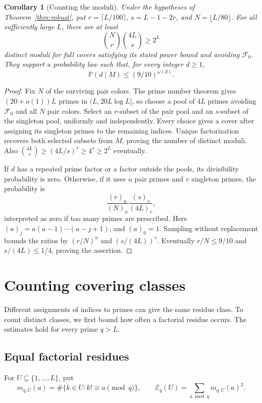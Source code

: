 \documentclass[11pt]{amsart}
\newtheorem{corollary}[theorem]{Corollary}
\theoremstyle{definition}
\theoremstyle{remark}
\begin{document}
\begin{corollary}[Counting the moduli]\label{cor:modulifamily}
Under the hypotheses of Theorem~\ref{thm:robust}, put
$r=\lceil L/100\rceil$, $s=L-1-2r$, and $N=\lfloor L/80\rfloor$.
For all sufficiently large $L$, there are at least
\[
\binom Nr\binom{4L}s\geq2^L
\]
distinct moduli for full covers satisfying its stated power bound and avoiding
$\mathcal F_0$. They support a probability law such that, for every
integer $d\geq1$,
\[
\mathbb P(d\mid M)\leq(9/10)^{\omega(d)}.
\]
\end{corollary}
\begin{proof}
Fix $N$ of the surviving pair colors. The prime number theorem gives
$(20+o(1))L$ primes in $(L,20L\log L]$, so choose a pool of $4L$ primes
avoiding $\mathcal F_0$ and all $N$ pair colors. Select an $r$-subset of
the pair pool and an $s$-subset of the singleton pool, uniformly and
independently. Every choice gives a cover after assigning its singleton
primes to the remaining indices. Unique factorization recovers both
selected subsets from $M$, proving the number of distinct moduli.
Also $\binom{4L}s\geq(4L/s)^s\geq4^s\geq2^L$ eventually.

If $d$ has a repeated prime factor or a factor outside the pools, its
divisibility probability is zero. Otherwise, if it uses $u$ pair primes
and $v$ singleton primes, the probability is
\[
\frac{(r)_u}{(N)_u}\frac{(s)_v}{(4L)_v},
\]
interpreted as zero if too many primes are prescribed.
Here $(a)_j=a(a-1)\cdots(a-j+1)$, and $(a)_0=1$.
Sampling without replacement bounds the ratios by $(r/N)^u$ and
$(s/(4L))^v$. Eventually $r/N\leq9/10$ and $s/(4L)\leq1/4$, proving
the assertion.
\end{proof}

\section{Counting covering classes}\label{sec:ensemble}

Different assignments of indices to primes can give the same residue
class. To count distinct classes, we first bound how often a factorial
residue occurs. The estimates hold for every prime $q>L$.

\subsection{Equal factorial residues}
For $U\subseteq\{1,\ldots,L\}$, put
\[
m_{q,U}(a)=\#\{k\in U:k!\equiv a\pmod q\},
\qquad
\mathcal E_q(U)=\sum_{a\bmod q}m_{q,U}(a)^2.
\]
\end{document}
